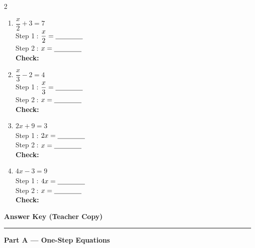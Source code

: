 \documentclass[12pt]{article}
\newcommand{\wsp}{\vspace{2.6cm}}
\newcommand{\sblank}{\underline{\hspace{1.4cm}}}
\begin{document}
\begin{multicols}{2}
\begin{enumerate}[label=\textbf{\arabic*.}, itemsep=0pt]
  \item $\dfrac{x}{2} + 3 = 7$\\[6pt]
  Step \textcircled{1}: $\dfrac{x}{2} = \sblank$\\[6pt]
  Step \textcircled{2}: $x = \sblank$\\[4pt]
  \textbf{Check:} \underline{\hspace{3.5cm}}
  \wsp

  \item $\dfrac{x}{3} - 2 = 4$\\[6pt]
  Step \textcircled{1}: $\dfrac{x}{3} = \sblank$\\[6pt]
  Step \textcircled{2}: $x = \sblank$\\[4pt]
  \textbf{Check:} \underline{\hspace{3.5cm}}
  \wsp

  \item $2x + 9 = 3$\\[4pt]
  Step \textcircled{1}: $2x = \sblank$\\[4pt]
  Step \textcircled{2}: $x = \sblank$\\[4pt]
  \textbf{Check:} \underline{\hspace{3.5cm}}
  \wsp

  \item $4x - 3 = 9$\\[4pt]
  Step \textcircled{1}: $4x = \sblank$\\[4pt]
  Step \textcircled{2}: $x = \sblank$\\[4pt]
  \textbf{Check:} \underline{\hspace{3.5cm}}
  \wsp

\end{enumerate}
\end{multicols}

\newpage

\begin{center}
  {\large\bfseries Answer Key \quad (Teacher Copy)}\\[4pt]
  \rule{\textwidth}{1pt}
\end{center}

\vspace{10pt}

\noindent\textbf{Part A --- One-Step Equations}
\end{document}
